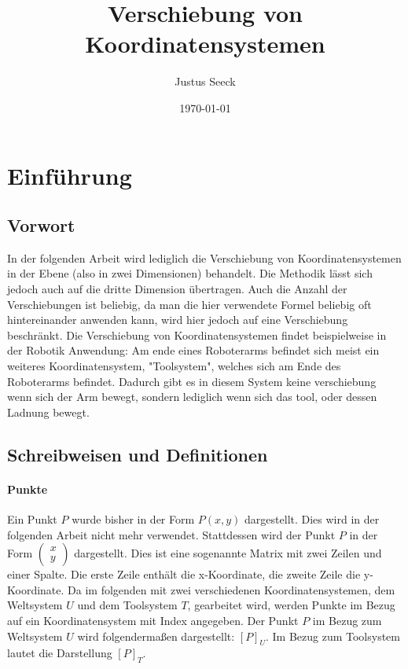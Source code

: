 \documentclass{article}
\title{Verschiebung von Koordinatensystemen}
\author{Justus Seeck}
\date{\today}
\newcommand{\m}[1]{\begin{pmatrix}#1\end{pmatrix}}
\begin{document}
    \maketitle

    \tableofcontents

    \newpage

    \section{Einführung}

    \subsection{Vorwort}

    In der folgenden Arbeit wird lediglich die Verschiebung von Koordinatensystemen in der Ebene (also in zwei Dimensionen) behandelt.
    Die Methodik lässt sich jedoch auch auf die dritte Dimension übertragen. Auch die Anzahl der Verschiebungen ist beliebig, da man die
    hier verwendete Formel beliebig oft hintereinander anwenden kann, wird hier jedoch auf eine Verschiebung beschränkt.
    Die Verschiebung von Koordinatensystemen findet beispielweise in der Robotik Anwendung: Am ende eines Roboterarms befindet sich meist ein weiteres Koordinatensystem, "Toolsystem", welches sich am Ende des Roboterarms befindet. Dadurch gibt es in diesem System keine verschiebung wenn sich der Arm bewegt, sondern lediglich wenn sich das tool, oder dessen Ladnung bewegt.

    \subsection{Schreibweisen und Definitionen}
    
    \paragraph{Punkte}

    Ein Punkt $P$ wurde bisher in der Form $P(x,y)$ dargestellt. Dies wird in der folgenden Arbeit nicht mehr verwendet. Stattdessen wird
    der Punkt $P$ in der Form $\m{x \\ y}$ dargestellt. Dies ist eine sogenannte Matrix mit zwei Zeilen und einer Spalte.
    Die erste Zeile enthält die x-Koordinate, die zweite Zeile die y-Koordinate.
    Da im folgenden mit zwei verschiedenen Koordinatensystemen, dem Weltsystem $U$ und dem Toolsystem $T$, gearbeitet wird,
    werden Punkte im Bezug auf ein Koordinatensystem mit Index angegeben. Der Punkt $P$ im Bezug zum Weltsystem $U$ wird
    folgendermaßen dargestellt: ${[P]}_{U}$.
    Im Bezug zum Toolsystem lautet die Darstellung ${[P]}_{T}$.
    
\end{document}
